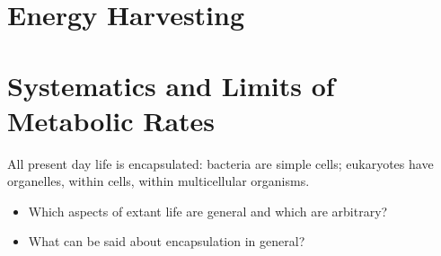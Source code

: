 \documentclass[]{article}
\begin{document}
\section{Energy Harvesting}

\cite{simon2008organisation}

\section{Systematics and Limits of Metabolic Rates}

All present day life is encapsulated: bacteria are simple cells; eukaryotes have organelles, within cells, within multicellular organisms.
\begin{itemize}
	\item Which aspects of extant life are general and 	which are arbitrary?
	\item What can be said about encapsulation in general?
\end{itemize}

\printglossaries

 


\end{document}
